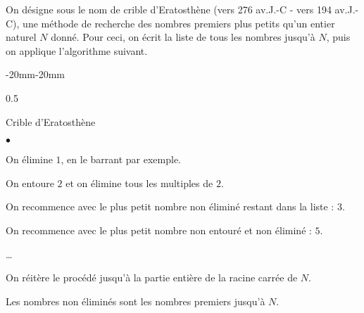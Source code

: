 \begin{activite}
    \vspace*{-7mm}
    On désigne sous le nom de crible d'Eratosthène (vers 276 av.J.-C - vers 194 av.J.-C),
    une méthode de recherche des nombres premiers plus petits qu'un entier naturel $N$ donné.
    \smallskip
    Pour ceci, on écrit la liste de tous les nombres jusqu'à $N$, puis on applique l'algorithme suivant.
    \begin{changemargin}{-20mm}{-20mm}
        \begin{center}
            \begin{spacing}{0.5}
                \begin{myBox}{Crible d'Eratosthène}		
                    \begin{list}{$\bullet$}{}
                        \item On élimine $1$, en le barrant par exemple.
                        \item On entoure $2$ et on élimine tous les multiples de $2$.
                        \item On recommence avec le plus petit nombre non éliminé restant dans la liste : $3$.
                        \item On recommence avec le plus petit nombre non entouré et non éliminé : $5$.
                        \item \dots
                        \item On réitère le procédé jusqu'à la partie entière de la racine carrée de $N$.
                    \end{list}
                \end{myBox}
                \end{spacing}
        \end{center}
    \end{changemargin}
    Les nombres non éliminés sont les nombres premiers jusqu'à $N$.


\end{activite}
